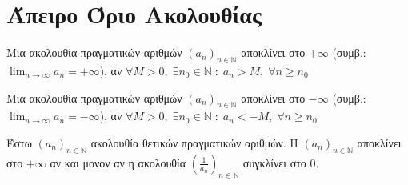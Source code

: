 \documentclass[main.tex]{subfiles}
\begin{document}
\section{Άπειρο Όριο Ακολουθίας}


\begin{dfn}
    Μια ακολουθία πραγματικών αριθμών $ (a_{n})_{n \in \mathbb{N}} $ 
    αποκλίνει στο $ +\infty $ (συμβ.: $ \lim_{n \to \infty} a_{n} = + 
    \infty $), αν $ \forall M>0, \; \exists n_{0} \in 
    \mathbb{N} \; : \; a_{n} > M, \; \forall n \geq n_{0}$
\end{dfn}

\begin{dfn}
    Μια ακολουθία πραγματικών αριθμών $ (a_{n})_{n \in \mathbb{N}} $ 
    αποκλίνει στο $ -\infty $ (συμβ.: $ \lim_{n \to \infty} a_{n} = - 
    \infty $), αν $ \forall M>0, \; \exists n_{0} \in 
    \mathbb{N} \; : \; a_{n} < -M, \; \forall n \geq n_{0}$
\end{dfn}

\begin{prop}
    Έστω $ (a_{n})_{n \in \mathbb{N}} $ ακολουθία θετικών 
    πραγματικών αριθμών. 
    Η $ (a_{n})_{n \in \mathbb{N}} $ αποκλίνει στο $ + \infty $ αν και 
    μονον αν η ακολουθία 
    $ \left(\frac{1}{a_{n}} \right)_{n \in \mathbb{N}} $ συγκλίνει 
    στο 0.
\end{prop}
\end{document}
